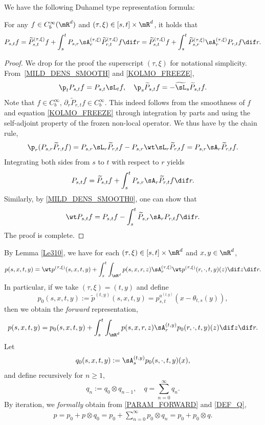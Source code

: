We have the following Duhamel type representation formula:
\begin{lemma}\label{Le310}
For any $f\in C_b^\infty(\mR^d)$ and $(\tau,\xi)\in[s,t]\times\mR^d$, it holds that
\[
P_{s,t}f=\widetilde P^{(\tau,\xi)}_{s,t}f+\int^t_sP_{s,r}\sA^{(\tau,\xi)}_r\widetilde P^{(\tau,\xi)}_{r,t}f\dif r
=\widetilde P^{(\tau,\xi)}_{s,t}f+\int^t_s\widetilde P^{(\tau,\xi)}_{s,r}\sA^{(\tau,\xi)}_rP_{r,t}f\dif r.
\]
\end{lemma}
\begin{proof}
We drop for the proof the superscript $(\tau,\xi)$ for notational simplicity. From~\eqref{MILD_DENS_SMOOTH} and \eqref{KOLMO_FREEZE},
\[
\p_t P_{s,t}f=P_{s,t}\sL_t f,\quad \p_s \widetilde P_{s,t}f=-\widetilde \sL_s\widetilde P_{s,t}f.
\]
Note that $f\in C_b^\infty$, $\partial_r \widetilde P_{r,t}f\in C^\infty_b$. {This indeed follows from the smoothness of $f$ and equation \eqref{KOLMO_FREEZE} through integration by parts and using the self-adjoint property of the frozen non-local operator}. We thus have by the chain rule,
\[
\p_r(P_{s,r}\widetilde P_{r,t}f)=P_{s,r}\sL_r\widetilde P_{r,t}f-P_{s,r}\wt\sL_r\widetilde P_{r,t}f
=P_{s,r}\sA_r\widetilde P_{r,t}f.
\]
Integrating both sides from $s$ to $t$ with respect to $r$ yields\vspace*{-3pt}
\[
P_{s,t}f=\widetilde P_{s,t}f+\int^t_sP_{s,r}\sA_r\widetilde P_{r,t}f\dif r.
\]
Similarly, by \eqref{MILD_DENS_SMOOTH0}, one can show that\vspace*{-3pt}
\[
\wt P_{s,t}f= P_{s,t}f-\int^t_s\widetilde P_{s,r}\sA_rP_{r,t}f\dif r.
\]
The proof is complete.
\end{proof}

By Lemma \ref{Le310}, we have for each $(\tau,\xi)\in[s,t]\times\mR^d$ and $x,y\in\mR^d$,
\[
p(s,x,t,y)
=\wt p^{(\tau,\xi)}(s,x,t,y)+
\int^t_s\int_{\mR^d}p(s,x,r,z)\sA^{(\tau,\xi)}_{r}\wt p^{(\tau,\xi)}(r,\cdot,t,y)(z)\dif z\dif r.
\]
In particular, if we take $(\tau,\xi)=(t,y)$ and define
\begin{equation}\label{Fre}
p_0(s,x,t,y):=\tilde p^{(t,y)}(s,x,t,y)= p_{{s,t}}^{a^{(t,y)}}(x-\theta_{t,s}(y)),
\end{equation}
then we obtain the {\it forward} representation,
\begin{equation}\label{PARAM_FORWARD}
p(s,x,t,y)
=p_0(s,x,t,y)+
\int^t_s\int_{\mR^d}p(s,x,r,z)\sA^{(t,y)}_{r}p_0(r,\cdot,t,y)(z)\dif z\dif r.
\end{equation}
Let\vspace*{-3pt}
\[
q_0(s,x,t,y):=\sA^{(t,y)}_{s}p_0(s,\cdot,t,y)(x),
\]
and define recursively for $n\ge 1 $,\vspace*{-3pt}
\begin{equation}\label{DEF_Q}
q_n:=q_0\otimes q_{n-1},\quad q=\sum_{n=0}^\infty q_n.
\end{equation}
By iteration, we \textit{formally} obtain from \eqref{PARAM_FORWARD} and \eqref{DEF_Q},
\begin{align}\label{Eq1}
p=p_0+p\otimes q_0=p_0+\sum_{n=0}^\infty p_0\otimes q_n=p_0+p_0\otimes q.
\end{align}

